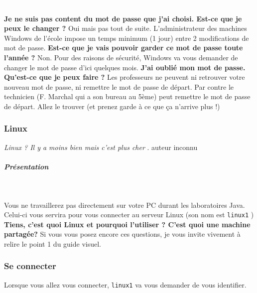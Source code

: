 \documentclass[11pt,a4paper]{article}
\begin{document}
					\textcolor{white}{.} \par
				
            \par
         \textbf{Je ne suis pas content du mot de passe que j'ai choisi. Est-ce que je peux le changer ?} 
Oui mais pas tout de suite. L'administrateur des machines Windows de l'\'ecole impose un temps minimum (1 jour) entre 2 modifications de mot de passe.
 \textbf{Est-ce que je vais pouvoir garder ce mot de passe toute l'ann\'ee ?} 
Non. Pour des raisons de s\'ecurit\'e, Windows va vous demander de changer le mot de passe d'ici quelques mois.
 \textbf{J'ai oubli\'e mon mot de passe. Qu'est-ce que je peux faire ?} 
Les professeurs ne peuvent ni retrouver votre nouveau mot de passe, ni
remettre le mot de passe de d\'epart. Par contre le technicien (F.
Marchal qui a son bureau au 5\`eme) peut remettre le mot de passe de
d\'epart. Allez le trouver (et prenez garde \`a ce que \c ca n'arrive plus !)

			
		\subsubsection{Linux} 
		\label{TD1TD1learningObject2.tex}
			



\guillemotleft   \textit{Linux ? Il y a moins bien mais c'est plus cher}  \guillemotright . auteur inconnu 


  
			
		\subparagraph{Pr\'esentation} 
		
					\textcolor{white}{.} \par
				
            \par
        
Vous ne travaillerez pas directement sur votre PC durant les laboratoires Java.
Celui-ci vous servira pour vous connecter au serveur Linux (son nom est  \texttt{linux1} )
 \textbf{Tiens, c'est quoi Linux et pourquoi l'utiliser ? C'est quoi une machine partag\'ee?} 
Si vous vous posez encore ces questions, je vous invite vivement \`a relire le point 1 du guide visuel.
			
		\subsubsection{Se connecter} 
		\label{TD1TD1learningObject3.tex}
			

Lorsque vous allez vous connecter,  \texttt{linux1}  va vous demander de vous identifier.
\end{document}

